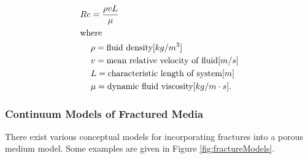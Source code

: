 \begin{align}
  Re &= \frac{\rho v L}{\mu}\\
     \intertext{where}
     &\rho = \mbox{fluid density} [kg/m^{3}]\\
     &v = \mbox{mean relative velocity of fluid} [m/s]\\
     &L = \mbox{characteristic length of system} [m]\\
     &\mu = \mbox{dynamic fluid viscosity} [kg/m\cdot s].
\end{align}






\subsubsection{Continuum Models of Fractured Media} 

There exist various conceptual models for incorporating fractures into a porous  
medium model. Some examples are given in Figure \ref{fig:fractureModels}.

